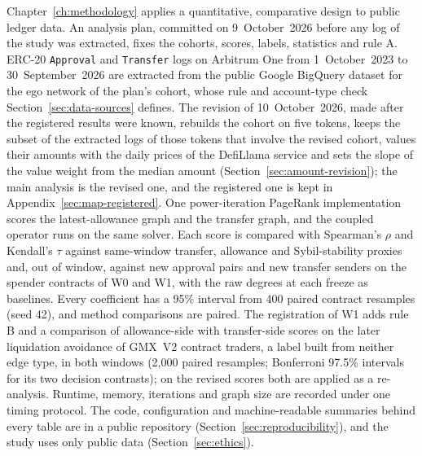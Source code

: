 
Chapter~\ref{ch:methodology} applies a quantitative, comparative design to public ledger data. An analysis plan, committed on 9~October~2026 before any log of the study was extracted, fixes the cohorts, scores, labels, statistics and rule A. ERC-20 \texttt{Approval} and \texttt{Transfer} logs on Arbitrum One from 1~October~2023 to 30~September~2026 are extracted from the public Google BigQuery dataset for the ego network of the plan's cohort, whose rule and account-type check Section~\ref{sec:data-sources} defines. The revision of 10~October~2026, made after the registered results were known, rebuilds the cohort on five tokens, keeps the subset of the extracted logs of those tokens that involve the revised cohort, values their amounts with the daily prices of the DefiLlama service \parencite{defillamanddocs} and sets the slope of the value weight from the median amount (Section~\ref{sec:amount-revision}); the main analysis is the revised one, and the registered one is kept in Appendix~\ref{sec:map-registered}. One power-iteration PageRank implementation scores the latest-allowance graph and the transfer graph, and the coupled operator runs on the same solver. Each score is compared with Spearman's $\rho$ and Kendall's $\tau$ against same-window transfer, allowance and Sybil-stability proxies and, out of window, against new approval pairs and new transfer senders on the spender contracts of W0 and W1, with the raw degrees at each freeze as baselines. Every coefficient has a 95\% interval from 400 paired contract resamples (seed 42), and method comparisons are paired. The registration of W1 adds rule B and a comparison of allowance-side with transfer-side scores on the later liquidation avoidance of GMX~V2 contract traders, a label built from neither edge type, in both windows (2{,}000 paired resamples; Bonferroni 97.5\% intervals for its two decision contrasts); on the revised scores both are applied as a re-analysis. Runtime, memory, iterations and graph size are recorded under one timing protocol. The code, configuration and machine-readable summaries behind every table are in a public repository (Section~\ref{sec:reproducibility}), and the study uses only public data (Section~\ref{sec:ethics}).


